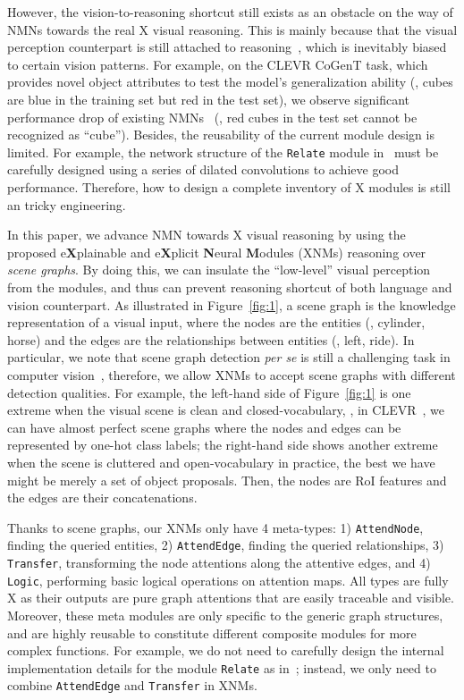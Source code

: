 \documentclass[10pt,twocolumn,letterpaper]{article}
\begin{document}
However, the vision-to-reasoning shortcut still exists as an obstacle on the way of NMNs towards the real X visual reasoning. This is mainly because that the visual perception counterpart is still attached to reasoning~\cite{mascharka2018transparency}, which is inevitably biased to certain vision patterns. For example, on the CLEVR CoGenT task, which provides novel object attributes to test the model's generalization ability (\eg, cubes are blue in the training set but red in the test set), we observe significant performance drop of existing NMNs~\cite{johnson2017inferring,mascharka2018transparency} (\eg, red cubes in the test set cannot be recognized as ``cube''). 
Besides, the reusability of the current module design is limited. For example, the network structure of the \texttt{Relate} module in~\cite{mascharka2018transparency} must be carefully designed using a series of dilated convolutions to achieve good performance. Therefore, how to design a complete inventory of X modules is still an tricky engineering. 

In this paper, we advance NMN towards X visual reasoning by using the proposed e\textbf{X}plainable and e\textbf{X}plicit \textbf{N}eural \textbf{M}odules (XNMs) reasoning over \emph{scene graphs}. By doing this, we can insulate the ``low-level'' visual perception from the modules, and thus can prevent reasoning shortcut of both language and vision counterpart. As illustrated in Figure~\ref{fig:1}, a scene graph is the knowledge representation of a visual input, where the nodes are the entities (\eg, cylinder, horse) and the edges are the relationships between entities (\eg, left, ride). In particular, we note that scene graph detection \textit{per se} is still a challenging task in computer vision~\cite{zellers2018motifs}, therefore, we allow XNMs to accept scene graphs with different detection qualities. For example, the left-hand side of Figure~\ref{fig:1} is one extreme when the visual scene is clean and closed-vocabulary, \eg, in CLEVR~\cite{johnson2017clevr}, we can have almost perfect scene graphs where the nodes and edges can be represented by one-hot class labels; the right-hand side shows another extreme when the scene is cluttered and open-vocabulary in practice, the best we have might be merely a set of object proposals. Then, the nodes are RoI features and the edges are their concatenations. 

Thanks to scene graphs, our XNMs only have 4 meta-types: 1) \texttt{AttendNode}, finding the queried entities, 2) \texttt{AttendEdge}, finding the queried relationships, 3) \texttt{Transfer}, transforming the node attentions along the attentive edges, and 4) \texttt{Logic}, performing basic logical operations on attention maps. All types are fully X as their outputs are pure graph attentions that are  easily traceable and visible. 
Moreover, these meta modules are only specific to the generic graph structures, and are highly reusable to constitute different composite modules for more complex functions.
For example, we do not need to carefully design the internal implementation details for the module \texttt{Relate} as in~\cite{mascharka2018transparency}; instead, we only need to combine \texttt{AttendEdge} and \texttt{Transfer} in XNMs.
\end{document}
